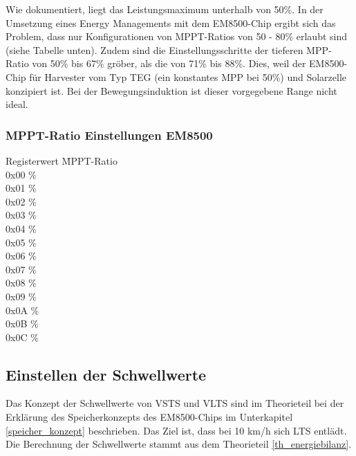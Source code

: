 Wie dokumentiert, liegt das Leistungsmaximum unterhalb von 50\thinspace\%. In der Umsetzung eines Energy Managements mit dem EM8500-Chip ergibt sich das Problem, dass nur Konfigurationen von MPPT-Ratios von 50 - 80\thinspace\% erlaubt sind (siehe Tabelle unten). Zudem sind die Einstellungsschritte der tieferen MPP-Ratio von 50\thinspace\% bis 67\thinspace\% gröber, als die von 71\thinspace\% bis 88\thinspace\%. Dies, weil der EM8500-Chip für Harvester vom Typ TEG (ein konstantes MPP bei 50\thinspace\%) und Solarzelle konzipiert ist. Bei der Bewegungsinduktion ist dieser vorgegebene Range nicht ideal.


\subsubsection*{MPPT-Ratio Einstellungen EM8500}
\begin{tabbing}
    Registerwert   \quad\= MPPT-Ratio    \\[0.8ex]
    0x00           \thinspace\% \\
    0x01           \thinspace\%\\
    0x02           \thinspace\%\\
    0x03           \thinspace\%\\
    0x04           \thinspace\%\\
    0x05           \thinspace\%\\
    0x06           \thinspace\% \\
    0x07           \thinspace\%\\
    0x08           \thinspace\%\\
    0x09           \thinspace\%\\
    0x0A           \thinspace\% \\
    0x0B           \thinspace\%\\
    0x0C           \thinspace\%\\
\end{tabbing}





\subsection{Einstellen der Schwellwerte}
\label{v_schwellwerte}

Das Konzept der Schwellwerte von VSTS und VLTS sind im Theorieteil bei der Erklärung des Speicherkonzepts des EM8500-Chips im Unterkapitel \ref{speicher_konzept} beschrieben. Das Ziel ist, dass bei 10 km/h sich LTS entlädt. Die Berechnung der Schwellwerte stammt aus dem Theorieteil \ref{th_energiebilanz}.



